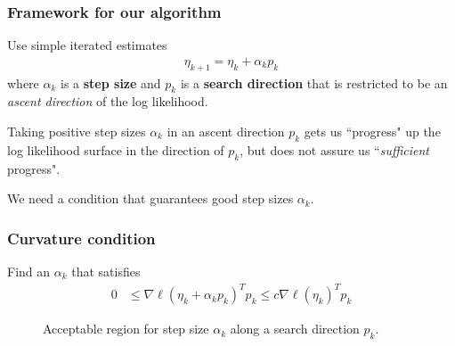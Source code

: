 \documentclass[slidestop,compress, 10pt]{beamer}
\begin{document}
\frame
{
\frametitle{Framework for our algorithm}
Use simple iterated estimates
\begin{align*}
	\eta_{k+1} = \eta_k + \alpha_k p_k
\end{align*}
where $\alpha_k$ is a \textbf{step size} and  $p_k$ is a \textbf{search direction} that
is restricted to be an \emph{ascent direction} of the log likelihood.
\vspace{2mm}

Taking positive step sizes $\alpha_k$ in an ascent direction $p_k$ gets us ``progress" up the log 
likelihood surface in the direction of $p_k$, but does not assure us 
``\emph{sufficient} progress".
\vspace{2mm}

We need a condition that guarantees good step sizes $\alpha_k$.
}


\frame
{
  \frametitle{Curvature condition}
Find an $\alpha_k$ that satisfies
\begin{align*}
	 0 & \leq \nabla \ell( \eta_k + \alpha_k p_k)^T p_k \leq c \nabla \ell(\eta_k)^T 
p_k
\end{align*}
\begin{figure}[h]
\centering
    \scalebox{.25}{}
	\caption{Acceptable region for step size $\alpha_k$ along a search direction $p_k$.}
\label{F:alpha_region}
\end{figure}
}
\end{document}

